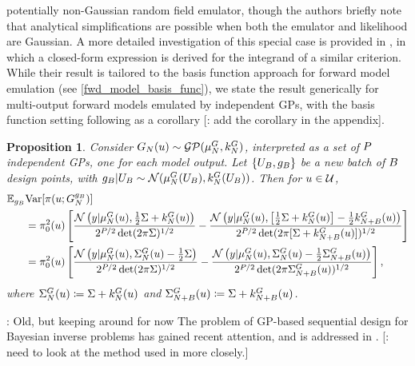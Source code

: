 \documentclass[12pt]{article}
\newtheorem{prop}{Proposition}
\begin{document}
potentially non-Gaussian random field emulator, though the authors briefly note that analytical simplifications 
are possible when both the emulator and likelihood are Gaussian. A more detailed investigation of this 
special case is provided in \cite{Surer2023sequential}, in which a closed-form expression is derived for the 
integrand of a similar criterion. While their result is tailored to the basis function approach for forward model 
emulation (see \ref{fwd_model_basis_func}), we state the result generically for multi-output forward models 
emulated by independent GPs, with the basis function setting following as a corollary
[\todo: add the corollary in the appendix].  
\begin{prop} \label{prop:evar-fwd-emulation}
Consider 
$\fwdEm(\Par) \sim \GP(\emMean[\Ndesign]{\fwd}, \emKer[\Ndesign]{\fwd})$, interpreted as a set of $\dimObs$ independent 
GPs, one for each model output. Let $\{\designBatchIn, \designBatchFwd\}$ be a new batch of $\Nbatch$ 
design points, with
$\designBatchFwd | \designBatchIn \sim \Gaussian(\emMean[\Ndesign]{\fwd}(\designBatchIn), \emKer[\Ndesign]{\fwd}(\designBatchIn))$.
Then for $\Par \in \parSpace$, 
\begin{align}
\E_{\designBatchFwd} &\Var[\postDens(\Par; \fwdEmCond{\designBatchFwd})] \nonumber \\
&= \priorDens^2(\Par) \left[\frac{\Gaussian\left(\obs | \emMean{\fwd}(\Par), \frac{1}{2}\likPar + \emKer{\fwd}(\Par) \right)}{2^{\dimObs/2} \det(2\pi \likPar)^{1/2}} - 
\frac{\Gaussian\left(\obs | \emMean{\fwd}(\Par), \left[\frac{1}{2}\likPar + \emKer{\fwd}(\Par)\right] - \frac{1}{2}\emKer[\Naugment]{\fwd}(\Par) \right)}{2^{\dimObs/2} \det(2\pi [\likPar + \emKer[\Naugment]{\fwd}(\Par)])^{1/2}} \right] \label{fwd_evar1} \\
&= \priorDens^2(\Par) \left[\frac{\Gaussian\left(\obs | \emMean{\fwd}(\Par), \CovComb(\Par) - \frac{1}{2}\likPar \right)}{2^{\dimObs/2} \det(2\pi \likPar)^{1/2}} - 
\frac{\Gaussian\left(\obs | \emMean{\fwd}(\Par), \CovComb(\Par) - \frac{1}{2}\CovComb[\Naugment](\Par) \right)}{2^{\dimObs/2} \det(2\pi \CovComb[\Naugment](\Par))^{1/2}} \right], \label{fwd_evar2}
\end{align}
where $\CovComb(\Par) \Def \likPar + \emKer{\fwd}(\Par)$ and $\CovComb[\Naugment](\Par) \Def \likPar + \emKer[\Naugment]{\fwd}(\Par)$. 
\end{prop}


\todo: Old, but keeping around for now 
The problem of GP-based sequential design for Bayesian inverse problems  
has gained recent attention, and is addressed in 
\cite{SinsbeckNowak, Surer2023sequential, VehtariParallelGP, briol2017sampling, ranjan2016inverse, 
	landslideCalibration, KandasamyActiveLearning2015, Kandasamy_2017, wang2018adaptive,   
	weightedIVAR, quantileApprox, hydrologicalModel, briol2017sampling}. 
[\todo: need to look at the method used in \cite{quantileApprox, hydrologicalModel} more closely.]
\end{document}

